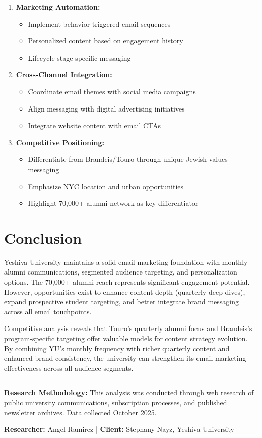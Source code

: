 \documentclass[12pt,letterpaper]{article}
\begin{document}
\begin{enumerate}[leftmargin=*]
    \item \textbf{Marketing Automation:}
    \begin{itemize}
        \item Implement behavior-triggered email sequences
        \item Personalized content based on engagement history
        \item Lifecycle stage-specific messaging
    \end{itemize}

    \item \textbf{Cross-Channel Integration:}
    \begin{itemize}
        \item Coordinate email themes with social media campaigns
        \item Align messaging with digital advertising initiatives
        \item Integrate website content with email CTAs
    \end{itemize}

    \item \textbf{Competitive Positioning:}
    \begin{itemize}
        \item Differentiate from Brandeis/Touro through unique Jewish values messaging
        \item Emphasize NYC location and urban opportunities
        \item Highlight 70,000+ alumni network as key differentiator
    \end{itemize}
\end{enumerate}

\section{Conclusion}

Yeshiva University maintains a solid email marketing foundation with monthly alumni communications, segmented audience targeting, and personalization options. The 70,000+ alumni reach represents significant engagement potential. However, opportunities exist to enhance content depth (quarterly deep-dives), expand prospective student targeting, and better integrate brand messaging across all email touchpoints.

Competitive analysis reveals that Touro's quarterly alumni focus and Brandeis's program-specific targeting offer valuable models for content strategy evolution. By combining YU's monthly frequency with richer quarterly content and enhanced brand consistency, the university can strengthen its email marketing effectiveness across all audience segments.

\vspace{0.5cm}

\noindent\rule{\textwidth}{0.4pt}

\textbf{Research Methodology:} This analysis was conducted through web research of public university communications, subscription processes, and published newsletter archives. Data collected October 2025.

\textbf{Researcher:} Angel Ramirez | \textbf{Client:} Stephany Nayz, Yeshiva University
\end{document}
